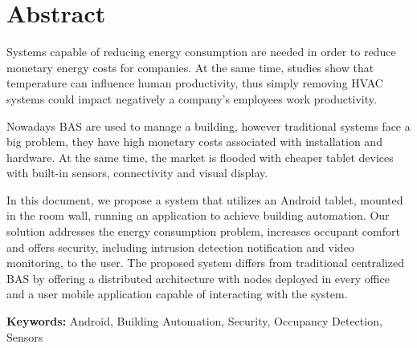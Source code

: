 \chapter*{Abstract}


Systems capable of reducing energy consumption are needed in order to reduce monetary energy costs for companies. At the same time, studies show that temperature can influence human productivity, thus simply removing \ac{HVAC} systems could impact negatively a company's employees work productivity.

Nowadays \ac{BAS} are used to manage a building, however traditional systems face a big problem, they have high monetary costs associated with installation and hardware. At the same time, the market is flooded with cheaper tablet devices with built-in sensors, connectivity and visual display.

In this document, we propose a system that utilizes an Android tablet, mounted in the room wall, running an application to achieve building automation. Our solution addresses the energy consumption problem, increases occupant comfort and offers security, including intrusion detection notification and video monitoring, to the user. The proposed system differs from traditional centralized \ac{BAS} by offering a distributed architecture with nodes deployed in every office and a user mobile application capable of interacting with the system. 




\vspace{1cm}

\textbf{\Large Keywords:} Android, Building Automation, Security, Occupancy Detection, Sensors

\cleardoublepage
